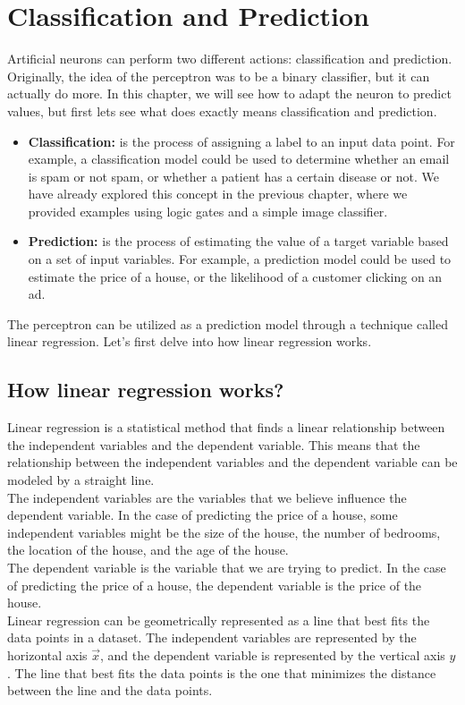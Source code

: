 \section{Classification and Prediction}
Artificial neurons can perform two different actions: classification and prediction. Originally, the idea of the
perceptron was to be a binary classifier, but it can actually do more. In this chapter, we will see how
to adapt the neuron to predict values, but first lets see what does exactly means classification and prediction.

\begin{itemize}
\item \textbf{Classification:} is the process of assigning a label to an input data point.
  For example, a classification model could be used to determine whether an email is spam or not spam, or
  whether a patient has a certain disease or not. We have already explored this concept in the previous chapter,
  where we provided examples using logic gates and a simple image classifier.
  
\item \textbf{Prediction:} is the process of estimating the value of a target variable based on a set of
  input variables. For example, a prediction model could be used to estimate the price of a house, or the
  likelihood of a customer clicking on an ad.
\end{itemize}

The perceptron can be utilized as a prediction model through a technique called linear regression.
Let's first delve into how linear regression works.

\subsection{How linear regression works?}
Linear regression is a statistical method that finds a linear relationship between the independent variables
and the dependent variable. This means that the relationship between the independent variables and
the dependent variable can be modeled by a straight line.\\
The independent variables are the variables that we believe influence the dependent variable. In the case
of predicting the price of a house, some independent variables might be the size of the house, the number of
bedrooms, the location of the house, and the age of the house.\\
The dependent variable is the variable that we are trying to predict. In the case of predicting the
price of a house, the dependent variable is the price of the house.\\
Linear regression can be geometrically represented as a line that best fits the data points in a dataset.
The independent variables are represented by the horizontal axis $\vec{x}$,
and the dependent variable is represented
by the vertical axis $y$. The line that best fits the data points is the one that minimizes the distance between
the line and the data points.


